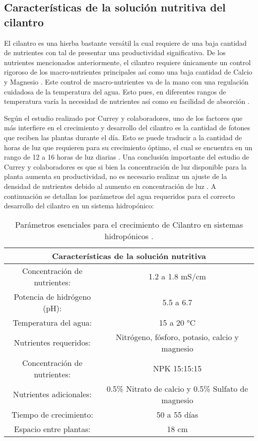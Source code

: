 \subsection*{Características de la solución nutritiva del cilantro}
El cilantro es una hierba bastante versátil la cual requiere de una baja cantidad de nutrientes con tal de presentar una productividad significativa. De los nutrientes mencionados anteriormente, el cilantro requiere únicamente un control rigoroso de los macro-nutrientes principales así como una baja cantidad de Calcio y Magnesio \cite{letpot_nodate}. Este control de macro-nutrientes va de la mano con una regulación cuidadosa de la temperatura del agua. Esto pues, en diferentes rangos de temperatura varía la necesidad de nutrientes así como su facilidad de absorción \cite{voogt_nutrient_2019}.

Según el estudio realizado por Currey y colaboradores, uno de los factores que más interfiere en el crecimiento y desarrollo del cilantro es la cantidad de fotones que reciben las plantas durante el día. Esto se puede traducir a la cantidad de horas de luz que requieren para su crecimiento óptimo, el cual se encuentra en un rango de 12 a 16 horas de luz diarias \cite{letpot_nodate}. Una conclusión importante del estudio de Currey y colaboradores es que si bien la concentración de luz disponible para la planta aumenta su productividad, no es necesario realizar un ajuste de la densidad de nutrientes debido al aumento en concentración de luz \cite{currey_nutrient_2019}. A continuación se detallan los parámetros del agua requeridos para el correcto desarrollo del cilantro en un sistema hidropónico:

\begin{table}[H]
	\centering
	\begin{tabular}{|c|c|}
		\hline
		\multicolumn{2}{|c|}{\textbf{Características de la solución nutritiva}}\\ \hline
		Concentración de nutrientes: & 1.2 a 1.8 mS/cm \\ \hline
		Potencia de hidrógeno (pH): & 5.5 a 6.7 \\ \hline
		Temperatura del agua: & 15 a 20 °C \\ \hline
		Nutrientes requeridos: & Nitrógeno, fósforo, potasio, calcio y magnesio \\ \hline
		Concentración de nutrientes: & NPK 15:15:15\\ \hline
		Nutrientes adicionales: &  0.5\% Nitrato de calcio y 0.5\% Sulfato de magnesio\\ \hline
		Tiempo de crecimiento: & 50 a 55 días\\ \hline
		Espacio entre plantas: & 18 cm \\ \hline
	\end{tabular}
	\caption{Parámetros esenciales para el crecimiento de Cilantro en sistemas hidropónicos \cite{mondol_use_2023} \cite{letpot_nodate}.}
	\label{Cuadro0}
\end{table}

